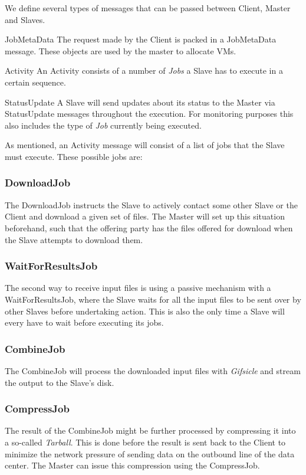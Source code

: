 \documentclass[twocolumn,twoside]{IEEEtran}
\begin{document}
We define several types of messages that can be passed between Client, Master and Slaves.
\begin{LaTeXdescription}
\item[JobMetaData] The request made by the Client is packed in a JobMetaData message. These objects are used by the master to allocate VMs.
\item[Activity] An Activity consists of a number of \emph{Jobs} a Slave has to execute in a certain sequence. 
\item[StatusUpdate] A Slave will send updates about its status to the Master via StatusUpdate messages throughout the execution. For monitoring purposes this also includes the type of \emph{Job} currently being executed.
\end{LaTeXdescription}

As mentioned, an Activity message will consist of a list of jobs that the Slave must execute. These possible jobs are:
\subsubsection{DownloadJob}
The DownloadJob instructs the Slave to actively contact some other Slave or the Client and download a given set of files.
The Master will set up this situation beforehand, such that the offering party has the files offered for download when the
Slave attempts to download them.
\subsubsection{WaitForResultsJob}
 The second way to receive input files is using a passive mechanism with a WaitForResultsJob, where the Slave waits for all the input files to be sent over by
other Slaves before undertaking action. This is also the only time a Slave will every have to wait before executing its jobs.
\subsubsection{CombineJob}
The CombineJob will process the downloaded input files with \emph{Gifsicle} and stream the output to the Slave's disk.
\subsubsection{CompressJob}
The result of the CombineJob might be further processed by compressing it into a so-called \textit{Tarball}. This is done before the result is sent back to the Client to minimize the network pressure of sending data on the outbound line of the data center. The Master can issue this compression using the CompressJob.
\end{document}
